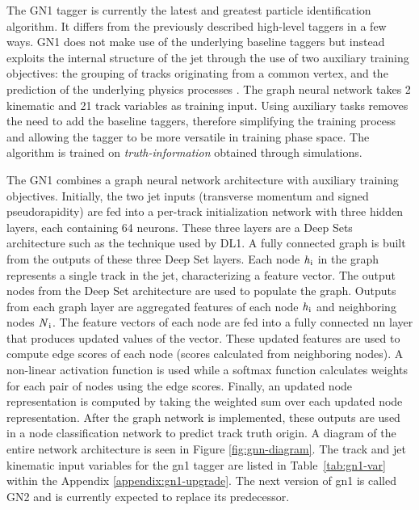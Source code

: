 The GN1 tagger is currently the latest and greatest particle identification algorithm. It differs from the previously described high-level taggers in a few ways. GN1 does not make 
use of the underlying baseline taggers but instead exploits the internal structure of the jet through the use of two auxiliary training objectives: the grouping of tracks originating 
from a common vertex, and the prediction of the underlying physics processes \cite{gnn-ftag}. The graph neural network takes 2 kinematic and 21 track variables as training input. Using auxiliary 
tasks removes the need to add the baseline taggers, therefore simplifying the training process and allowing the tagger to be more versatile in training phase space. The algorithm 
is trained on \textit{truth-information} obtained through simulations. 
\par
The GN1 combines a graph neural network architecture with auxiliary training objectives. Initially, the two jet inputs (transverse momentum and signed pseudorapidity) are fed 
into a per-track initialization network with three hidden layers, each containing 64 neurons. These three layers are a Deep Sets architecture such as the technique used by DL1.
A fully connected graph is built from the outputs of these three Deep Set layers. Each node $\textrm{\textit{h}}_{\textrm{i}}$ in the graph represents a single track in the jet, 
characterizing a feature vector. The output nodes from the Deep Set architecture are used to populate the graph. Outputs from each graph layer are aggregated features of each node 
$\textrm{\textit{h}}_{\textrm{i}}$ and neighboring nodes $\textrm{\textit{N}}_{\textrm{i}}$. The feature vectors of each node are fed into a fully connected \gls{nn} layer that 
produces updated values of the vector. These updated features are used to compute edge scores of each node (scores calculated from neighboring nodes). A non-linear activation 
function is used while a softmax function calculates weights for each pair of nodes using the edge scores. Finally, an updated node representation is computed by taking the 
weighted sum over each updated node representation. After the graph network is implemented, these outputs are used in a node classification network to predict track truth origin. 
A diagram of the entire network architecture is seen in Figure \ref{fig:gnn-diagram}. The track and jet kinematic input variables for the \gls{gn1} tagger are listed in Table~\ref{tab:gn1-var} within the Appendix \ref{appendix:gn1-upgrade}. The next version of \gls{gn1} is called GN2 and is currently expected to replace its predecessor. 


